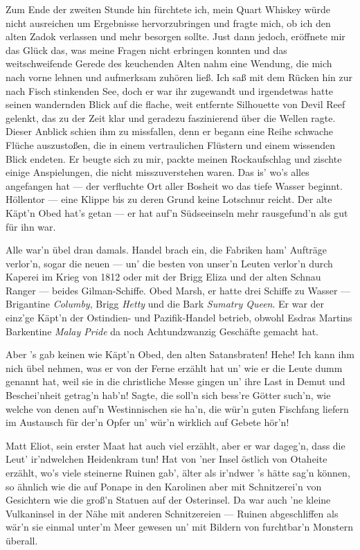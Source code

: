 Zum Ende der zweiten Stunde hin fürchtete ich, mein Quart Whiskey würde nicht ausreichen um Ergebnisse hervorzubringen und fragte mich, ob ich den alten Zadok verlassen und mehr besorgen sollte. Just dann jedoch, eröffnete mir das Glück das, was meine Fragen nicht erbringen konnten und das weitschweifende Gerede des keuchenden Alten nahm eine Wendung, die mich nach vorne lehnen und aufmerksam zuhören ließ. Ich saß mit dem Rücken hin zur nach Fisch stinkenden See, doch er war ihr zugewandt und irgendetwas hatte seinen wandernden Blick auf die flache, weit entfernte Silhouette von Devil Reef gelenkt, das zu der Zeit klar und geradezu faszinierend über die Wellen ragte. Dieser Anblick schien ihm zu missfallen, denn er begann eine Reihe schwache Flüche auszustoßen, die in einem vertraulichen Flüstern und einem wissenden Blick endeten. Er beugte sich zu mir, packte meinen Rockaufschlag und zischte einige Anspielungen, die nicht misszuverstehen waren.
\glqq Das is' wo's alles angefangen hat --- der verfluchte Ort aller Bosheit wo das tiefe Wasser beginnt. Höllentor --- eine Klippe bis zu deren Grund keine Lotschnur reicht. Der alte Käpt'n Obed hat's getan --- er hat auf'n Südseeinseln mehr rausgefund'n als gut für ihn war.

Alle war'n übel dran damals. Handel brach ein, die Fabriken ham' Aufträge verlor'n, sogar die neuen --- un' die besten von unser'n Leuten verlor'n durch Kaperei im Krieg von 1812 oder mit der Brigg Eliza und der alten Schnau Ranger --- beides Gilman-Schiffe. Obed Marsh, er hatte drei Schiffe zu Wasser --- Brigantine \textit{Columby}, Brigg \textit{Hetty} und die Bark \textit{Sumatry Queen}. Er war der einz'ge Käpt'n der Ostindien- und Pazifik-Handel betrieb, obwohl Esdras Martins Barkentine \textit{Malay Pride} da noch Achtundzwanzig Geschäfte gemacht hat.

Aber 's gab keinen wie Käpt'n Obed, den alten Satansbraten! Hehe! Ich kann ihm nich übel nehmen, was er von der Ferne erzählt hat un' wie er die Leute dumm genannt hat, weil sie in die christliche Messe gingen un' ihre Last in Demut und Beschei'nheit getrag'n hab'n! Sagte, die soll'n sich bess're Götter such'n, wie welche von denen auf'n Westinnischen sie ha'n, die wür'n guten Fischfang liefern im Austausch für der'n Opfer un' wür'n wirklich auf Gebete hör'n!

Matt Eliot, sein erster Maat hat auch viel erzählt, aber er war dageg'n, dass die Leut' ir'ndwelchen Heidenkram tun! Hat von 'ner Insel östlich von Otaheite erzählt, wo's viele steinerne Ruinen gab', älter als ir'ndwer 's hätte sag'n können, so ähnlich wie die auf Ponape in den Karolinen aber mit Schnitzerei'n von Gesichtern wie die groß'n Statuen auf der Osterinsel. Da war auch 'ne kleine Vulkaninsel in der Nähe mit anderen Schnitzereien --- Ruinen abgeschliffen als wär'n sie einmal unter'm Meer gewesen un' mit Bildern von furchtbar'n Monstern überall.

